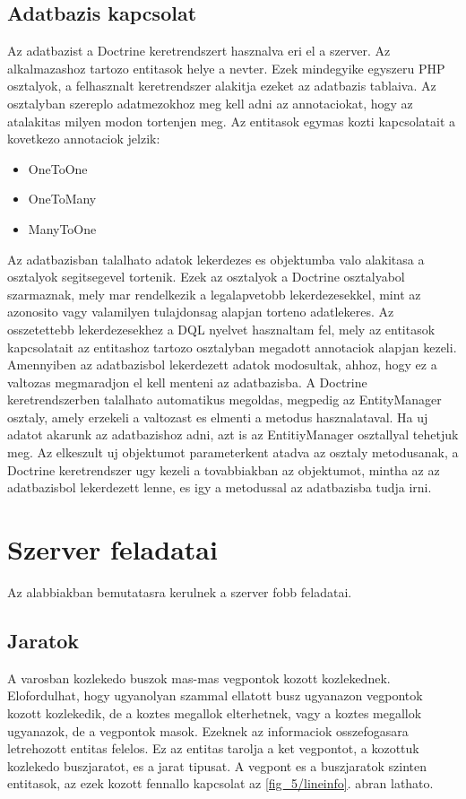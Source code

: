 \subsection*{Adatbazis kapcsolat}
\label{adatbazis}
Az adatbazist a Doctrine keretrendszert hasznalva eri el a szerver. 
Az alkalmazashoz tartozo entitasok helye a  nevter. 
Ezek mindegyike egyszeru PHP osztalyok, a felhasznalt keretrendszer alakitja ezeket az adatbazis tablaiva. 
Az osztalyban szereplo adatmezokhoz meg kell adni az annotaciokat, hogy az atalakitas milyen modon tortenjen meg. 
Az entitasok egymas kozti kapcsolatait a kovetkezo annotaciok jelzik:
\begin{itemize}
	\item OneToOne
	\item OneToMany
	\item ManyToOne
\end{itemize}
Az adatbazisban talalhato adatok lekerdezes es objektumba valo alakitasa a  osztalyok segitsegevel tortenik. 
Ezek az osztalyok a Doctrine  osztalyabol szarmaznak, mely mar rendelkezik a legalapvetobb lekerdezesekkel, mint az azonosito vagy valamilyen tulajdonsag alapjan torteno adatlekeres. 
Az osszetettebb lekerdezesekhez a DQL nyelvet hasznaltam fel, mely az entitasok kapcsolatait az entitashoz tartozo osztalyban megadott annotaciok alapjan kezeli. 
Amennyiben az adatbazisbol lekerdezett adatok modosultak, ahhoz, hogy ez a valtozas megmaradjon el kell menteni az adatbazisba. 
A Doctrine keretrendszerben talalhato automatikus megoldas, megpedig az EntityManager osztaly, amely erzekeli a valtozast es elmenti a  metodus hasznalataval. 
Ha uj adatot akarunk az adatbazishoz adni, azt is az EntitiyManager osztallyal tehetjuk meg. 
Az elkeszult uj objektumot parameterkent atadva az osztaly  metodusanak, a Doctrine keretrendszer ugy kezeli a tovabbiakban az objektumot, mintha az az adatbazisbol lekerdezett lenne, es igy a  metodussal az adatbazisba tudja irni. 
\section{Szerver feladatai}
\label{serverjob}
Az alabbiakban bemutatasra kerulnek a szerver fobb feladatai.
\subsection*{Jaratok}
\label{lineinfodetails}
A varosban kozlekedo buszok mas-mas vegpontok kozott kozlekednek. 
Elofordulhat, hogy ugyanolyan szammal ellatott busz ugyanazon vegpontok kozott kozlekedik, de a koztes megallok elterhetnek, vagy a koztes megallok ugyanazok, de a vegpontok masok. 
Ezeknek az informaciok osszefogasara letrehozott  entitas felelos. 
Ez az entitas tarolja a ket vegpontot, a kozottuk kozlekedo buszjaratot, es a jarat tipusat. 
A vegpont es a buszjaratok szinten entitasok, az ezek kozott fennallo kapcsolat az \ref{fig_5/lineinfo}. abran lathato. 
